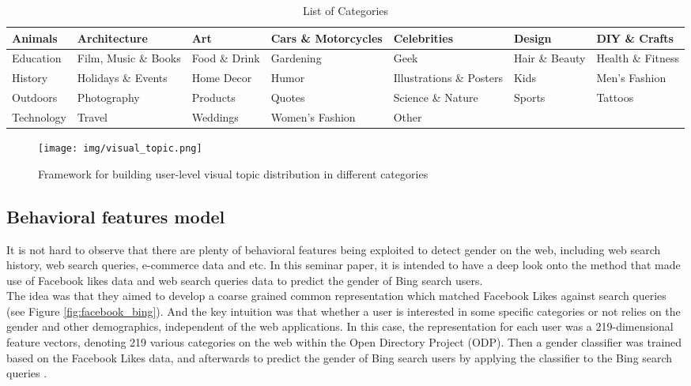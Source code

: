 \documentclass[runningheads]{llncs}
\begin{document}
	\begin{table}
		\caption{List of Categories}
		\hskip-2.0cm \begin{tabular}{| l | l | l | l | l | l | l | }
			\hline
			Animals & Architecture
& Art & Cars \& Motorcycles & Celebrities
& Design
& DIY \& Crafts \\
			\hline
			Education & Film, Music \& Books & 
Food \& Drink  & Gardening & Geek
& Hair \& Beauty
& Health \& Fitness \\
			\hline
			History & Holidays \& Events
& Home Decor &  Humor & Illustrations \& Posters
& Kids
& Men’s Fashion \\
			\hline
			Outdoors & Photography
& Products
& Quotes & Science \& Nature
& Sports
& Tattoos \\
			\hline
			Technology & Travel
 & Weddings
& Women’s Fashion & Other & &  \\
			\hline
		\end{tabular}
		\label{table:list-categories}
	\end{table}

	\begin{figure}
		\centering
		\texttt{[image: img/visual\_topic.png]}
		\caption{Framework for building user-level visual topic distribution in different categories}
		\label{fig:visual_topic}
	\end{figure}
	
	\subsection{Behavioral features model}
	
	It is not hard to observe that there are plenty of behavioral features being exploited to detect gender on the web, including web search history, web search queries, e-commerce data and etc. In this seminar paper, it is intended to have a deep look onto the method that made use of Facebook likes data and web search queries data to predict the gender of Bing search users. \\
	
	The idea was that they aimed to develop a coarse grained common representation which matched Facebook Likes against search queries (see Figure \ref{fig:facebook_bing}). And the key intuition was that whether a user is interested in some specific categories or not relies on the gender and other demographics, independent of the web applications. In this case, the representation for each user was a 219-dimensional feature vectors, denoting 219 various categories on the web within the Open Directory Project (ODP). Then a gender classifier was trained based on the Facebook Likes data, and afterwards to predict the gender of Bing search users by applying the classifier to the Bing search queries \cite{bi2013inferring}. \\
\end{document}
